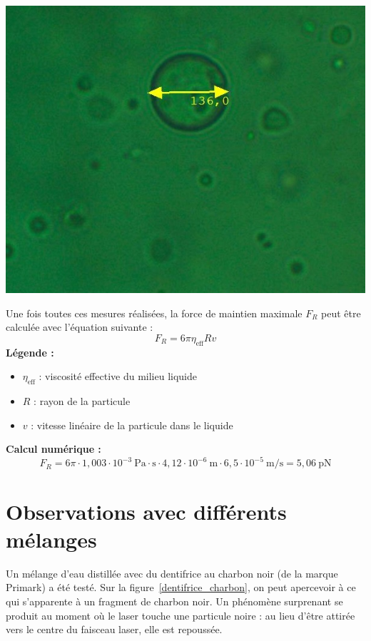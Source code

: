 \begin{minipage}{0.38\textwidth}
    \centering
    \includegraphics[width=\textwidth]{assets/figures/Notice de laboratoire/mesure_bead.jpg}
    \label{mesure_bead}
\end{minipage}
\newpage
Une fois toutes ces mesures réalisées, la force de maintien maximale \( F_R \) peut être calculée avec l'équation suivante :
\begin{equation}
    F_R = 6 \pi \eta_{\text{eff}} R v \tag{1}
\end{equation}
\textbf{Légende :}
\begin{itemize}[label=\textbullet]
    \item $\eta_{\text{eff}}$ : viscosité effective du milieu liquide
    \item $R$ : rayon de la particule
    \item $v$ : vitesse linéaire de la particule dans le liquide
\end{itemize}

\textbf{Calcul numérique :}
\[
    F_R = 6 \pi \cdot 1{,}003 \cdot 10^{-3}~\text{Pa}\cdot\text{s} \cdot 4{,}12 \cdot 10^{-6}~\text{m} \cdot 6{,}5 \cdot 10^{-5}~\text{m/s} = 5{,}06~\text{pN}
\]

\section{Observations avec différents mélanges}
Un mélange d'eau distillée avec du dentifrice au charbon noir (de la marque Primark) a été testé. Sur la figure~\ref{dentifrice_charbon}, on peut apercevoir à ce qui s'apparente à un fragment de charbon noir. Un phénomène surprenant se produit au moment où le laser touche une particule noire : au lieu d'être attirée vers le centre du faisceau laser, elle est repoussée.

